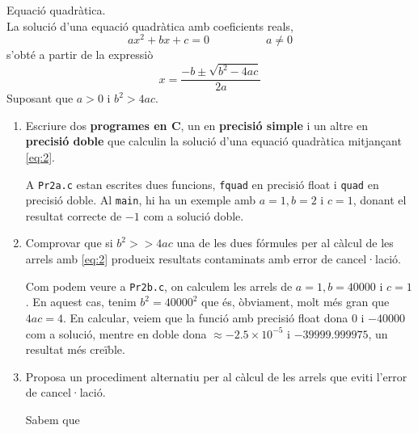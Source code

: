 \documentclass[a4paper, 12pt]{article}
\begin{document}
    \begin{exercici}
        Equació quadràtica.\\
        La solució d'una equació quadràtica amb coeficients reals,
        \begin{displaymath}
            ax^2+bx+c=0 \hspace{5em} a \neq 0
        \end{displaymath}
        s'obté a partir de la expressiò
        \begin{equation}
            x = \frac{-b\pm\sqrt{b^2-4ac}}{2a}
            \label{eq:2}
        \end{equation}
        Suposant que $a > 0$ i $b^2 > 4ac$.
        \begin{enumerate}[label=\alph*)]
            \item Escriure dos \textbf{programes en C}, un en \textbf{precisió simple} i un altre en
            \textbf{precisió doble} que calculin la solució d'una equació quadràtica mitjançant \eqref{eq:2}.\\
            \begin{solucio}
                A \verb|Pr2a.c| estan escrites dues funcions, \verb|fquad| en precisió float i \verb|quad|
                en precisió doble. Al \verb|main|, hi ha un exemple amb $a=1, b=2$ i $c=1$, donant
                el resultat correcte de $-1$ com a solució doble. 
            \end{solucio}
            \item Comprovar que si $b^2 >> 4ac$ una de les dues fórmules per al càlcul de les arrels
            amb \eqref{eq:2} produeix resultats contaminats amb error de cancel·lació.\\
            \begin{solucio}
                Com podem veure a \verb|Pr2b.c|, on calculem les arrels de $a=1, b=40000$ i $c=1$.
                En aquest cas, tenim $b^2 = 40000^2$ que és, òbviament, molt més gran que $4ac = 4$.
                En calcular, veiem que la funció amb precisió float dona $0$ i $-40000$ com a
                solució, mentre en doble dona $\approx-2.5\times10^{-5}$ i $ -39999.999975$, un
                resultat més creïble. 
            \end{solucio}
            \item Proposa un procediment alternatiu per al càlcul de les arrels que eviti l'error de
            cancel·lació.\\
            \begin{solucio}
                Sabem que

\end{solucio}
\end{enumerate}
\end{exercici}
\end{document}
